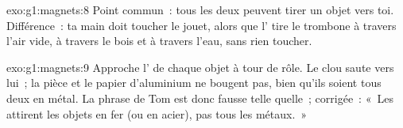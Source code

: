 \begin{solution}{exo:g1:magnets:8}
Point commun~: tous les deux peuvent tirer un objet vers toi.
Différence~: ta main doit toucher le jouet, alors que l' tire
le trombone à travers l'air vide, à travers le bois et à travers
l'eau, sans rien toucher.
\end{solution}

\begin{solution}{exo:g1:magnets:9}
Approche l' de chaque objet à tour de rôle. Le clou saute vers
lui~; la pièce et le papier d'aluminium ne bougent pas, bien qu'ils
soient tous deux en métal. La phrase de Tom est donc fausse telle
quelle~; corrigée~: «~Les  attirent les objets en fer (ou en
acier), pas tous les métaux.~»
\end{solution}
